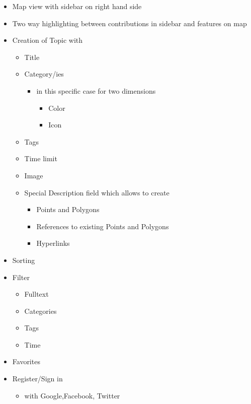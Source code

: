 \documentclass{sigchi}
\begin{document}
\begin{itemize}
\item Map view with sidebar on right hand side
\item Two way highlighting between contributions in sidebar and features on map
\item Creation of Topic with \begin{itemize}
    \item Title
    \item Category/ies \begin{itemize}
        \item in this specific case for two dimensions \begin{itemize}
            \item Color
            \item Icon
            \end{itemize}
        \end{itemize}
    \item Tags
    \item Time limit
    \item Image
    \item Special Description field which allows to create \begin{itemize}
        \item Points and Polygons
        \item References to existing Points and Polygons
        \item Hyperlinks
        \end{itemize}
    \end{itemize}
\item Sorting
\item Filter \begin{itemize}
    \item Fulltext
    \item Categories
    \item Tags
    \item Time
\end{itemize}
\item Favorites
\item Register/Sign in \begin{itemize}
    \item with Google,Facebook, Twitter
    \end{itemize}
\end{itemize}
\end{document}
